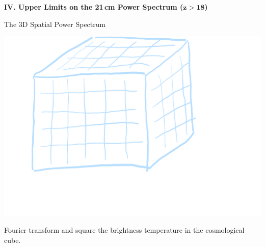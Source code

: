 \documentclass{beamer}
\renewcommand{\b}{\pmb}
\begin{document}
{
    \begin{frame}[t]

        {\large \bfseries IV. Upper Limits on the 21\,cm Power Spectrum ($\b{z>18}$)}
    \end{frame}
}

\begin{frame}{The 3D Spatial Power Spectrum}
    \begin{center}
        \includegraphics[height=0.5\textheight]{figures/cube}
    \end{center}
    Fourier transform and square the brightness temperature in the cosmological cube.
\end{frame}
\end{document}
